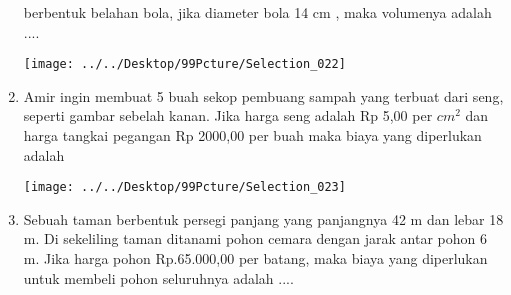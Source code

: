 \documentclass[12pt,a4paper,draft,final,oneside,twoside,openright,openany]{article}
\begin{document}
\begin{enumerate}
		berbentuk belahan bola, jika diameter bola 14 cm ,
		maka volumenya adalah ....
			\begin{center}
				\texttt{[image: ../../Desktop/99Pcture/Selection\_022]}
			\end{center}
		\item Amir ingin membuat 5 buah sekop pembuang sampah yang
		terbuat dari seng, seperti gambar sebelah kanan. Jika harga
		seng adalah Rp 5,00 per $cm^2$ dan harga tangkai pegangan Rp
		2000,00 per buah maka biaya yang diperlukan adalah
			\begin{center}
				\texttt{[image: ../../Desktop/99Pcture/Selection\_023]}
			\end{center}
		\item Sebuah taman berbentuk persegi panjang yang panjangnya 42 m dan lebar 18 m. Di
		sekeliling taman ditanami pohon cemara dengan jarak antar pohon 6 m. Jika harga
		pohon Rp.65.000,00 per batang, maka biaya yang diperlukan untuk membeli pohon
		seluruhnya adalah ....
	\end{enumerate}
		
\end{document}
